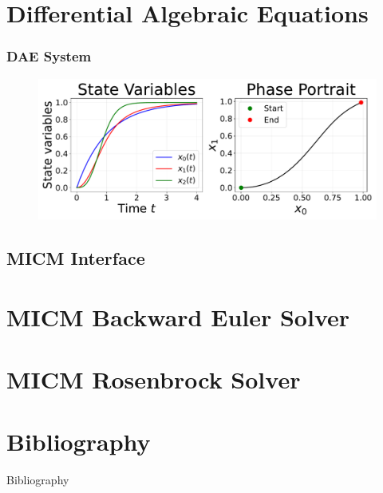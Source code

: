 \documentclass{beamer}
\begin{document}
\section{Differential Algebraic Equations}
\frametitle{DAE System}

\begin{frame}

\end{frame}

\begin{frame}

\end{frame}

\begin{frame}

\end{frame}

\begin{frame}


\end{frame}

\begin{frame}


\end{frame}

\begin{frame}
\begin{figure}
\includegraphics[scale=0.35]{../plots/dae_system.pdf}
\end{figure}
\end{frame}

\subsection{MICM Interface}

\section{MICM Backward Euler Solver}

\section{MICM Rosenbrock Solver}

\nocite{SanduI}
\nocite{SanduII}
\nocite{ODEsI}
\nocite{ODEsII}

\section{Bibliography}
\begin{frame}[allowframebreaks]{Bibliography}


\end{frame}
\end{document}
